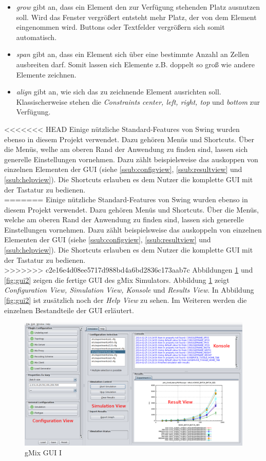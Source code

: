 \documentclass[a4paper, 11pt]{article} %
\begin{document}
\begin{itemize}
\item \emph{grow} gibt an, dass ein Element den zur Verfügung stehenden Platz ausnutzen soll. Wird das Fenster vergrößert entsteht mehr Platz, der von dem Element eingenommen wird. Buttons oder Textfelder vergrößern sich somit automatisch.
\item \emph{span} gibt an, dass ein Element sich über eine bestimmte Anzahl an Zellen ausbreiten darf. Somit lassen sich Elemente z.B. doppelt so groß wie andere Elemente zeichnen.
\item \emph{align} gibt an, wie sich das zu zeichnende Element ausrichten soll. Klassischerweise stehen die \emph{Constraints center, left, right, top} und \emph{bottom} zur Verfügung. 
\end{itemize}

<<<<<<< HEAD
Einige nützliche Standard-Features von Swing wurden ebenso in diesem Projekt verwendet. Dazu gehören Menüs und Shortcuts. Über die Menüs, welhe am oberen Rand der Anwendung zu finden sind, lassen sich generelle Einstellungen vornehmen. Dazu zählt beispielsweise das auskoppen von einzelnen Elementen der GUI (siehe \ref{ssub:configview}, \ref{ssub:resultview} und \ref{ssub:helpview}). Die Shortcuts erlauben es dem Nutzer die komplette GUI mit der Tastatur zu bedienen. \\
=======
Einige nützliche Standard-Features von Swing wurden ebenso in diesem Projekt verwendet. Dazu gehören Menüs und Shortcuts. Über die Menüs, welche am oberen Rand der Anwendung zu finden sind, lassen sich generelle Einstellungen vornehmen. Dazu zählt beispielsweise das auskoppeln von einzelnen Elementen der GUI (siehe \ref{ssub:configview}, \ref{ssub:resultview} und \ref{ssub:helpview}). Die Shortcuts erlauben es dem Nutzer die komplette GUI mit der Tastatur zu bedienen. \\
>>>>>>> c2e16e4d08ee5717d988bd4a6bd2836c173aab7c
Abbildungen \ref{fig:gui1} und \ref{fig:gui2} zeigen die fertige GUI des gMix Simulators. Abbildung \ref{fig:gui1} zeigt \emph{Configuration View, Simulation View, Konsole} und \emph{Results View}. In Abbildung \ref{fig:gui2} ist zusätzlich noch der \emph{Help View} zu sehen. Im Weiteren werden die einzelnen Bestandteile der GUI erläutert.

\begin{figure}[!htp]
\includegraphics[width=\textwidth]{img/gmixGuiSimulator}
\caption{gMix GUI I}
\label{fig:gui1}
\end{figure}
\end{document}
